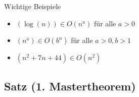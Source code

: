 Wichtige Beispiele

\begin{itemize}
	\item 	$(\log (n)) \in O(n^a)$ für alle $a > 0$ 
	
	\item $(n^a) \in O(b^n)$ für alle $a > 0, b > 1$
	
	\item $(n^2 + 7n + 44) \in O(n^2)$	
\end{itemize}

\subsection{Satz (1. Mastertheorem)} %

















